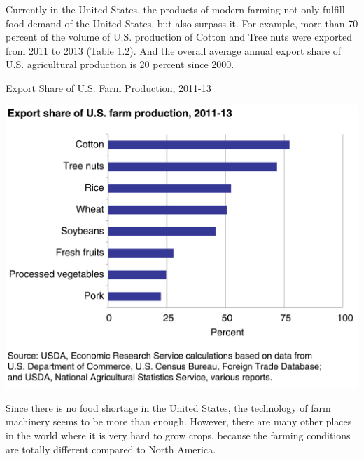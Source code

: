 Currently in the United States, the products of modern farming not only fulfill food demand of the United States, but also surpass it. For example, more than 70 percent of the volume of U.S. production of Cotton and Tree nuts were exported from 2011 to 2013 (Table 1.2). And the overall average annual export share of U.S. agricultural production is 20 percent since 2000. \cite{Exports}
\begin{table}[ht!]
\begin{center}
\caption{Export Share of U.S. Farm Production, 2011-13}
\includegraphics[scale = 0.4]{pics/cropexport.png}
\end{center}
\end{table}
Since there is no food shortage in the United States, the technology of farm machinery seems to be more than enough. However, there are many other places in the world where it is very hard to grow crops, because the farming conditions are totally different compared to North America. 
